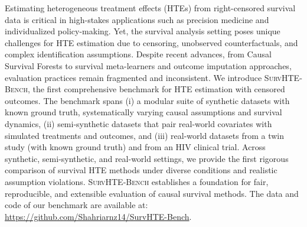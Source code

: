 \begin{ChFourAbstract}

Estimating heterogeneous treatment effects (HTEs) from right-censored survival data is critical in high-stakes applications such as precision medicine and individualized policy-making. Yet, the survival analysis setting poses unique challenges for HTE estimation due to censoring, unobserved counterfactuals, and complex identification assumptions. Despite recent advances, from Causal Survival Forests to survival meta-learners and outcome imputation approaches, evaluation practices remain fragmented and inconsistent. 
We introduce \textsc{SurvHTE‐Bench}, the first comprehensive benchmark for HTE estimation with censored outcomes. The benchmark spans (i) a modular suite of synthetic datasets with known ground truth, systematically varying causal assumptions and survival dynamics, 
(ii) semi-synthetic datasets that pair real-world covariates with simulated treatments and outcomes, and
(iii) real-world datasets from a twin study (with known ground truth) and from an HIV clinical trial.
Across synthetic, semi-synthetic, and real-world settings, we provide the first rigorous comparison of survival HTE methods under diverse conditions and realistic assumption violations. 
\textsc{SurvHTE‐Bench} establishes a foundation for fair, reproducible, and extensible evaluation of causal survival methods. The data and code of our benchmark are available at: \url{https://github.com/Shahriarnz14/SurvHTE-Bench}.
\end{ChFourAbstract}


